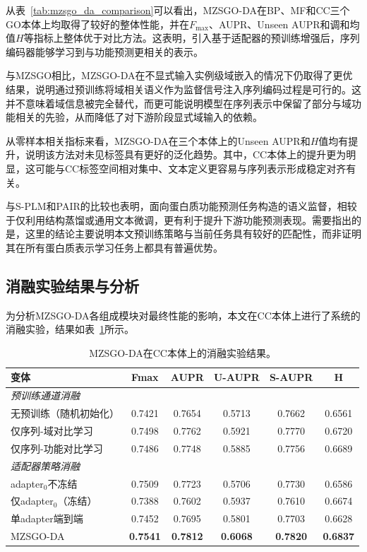 从表~\ref{tab:mzsgo_da_comparison}可以看出，MZSGO-DA在BP、MF和CC三个GO本体上均取得了较好的整体性能，并在$F_{\max}$、AUPR、Unseen AUPR和调和均值$H$等指标上整体优于对比方法。这表明，引入基于适配器的预训练增强后，序列编码器能够学习到与功能预测更相关的表示。

与MZSGO相比，MZSGO-DA在不显式输入实例级域嵌入的情况下仍取得了更优结果，说明通过预训练将域相关语义作为监督信号注入序列编码过程是可行的。这并不意味着域信息被完全替代，而更可能说明模型在序列表示中保留了部分与域功能相关的先验，从而降低了对下游阶段显式域输入的依赖。

从零样本相关指标来看，MZSGO-DA在三个本体上的Unseen AUPR和$H$值均有提升，说明该方法对未见标签具有更好的泛化趋势。其中，CC本体上的提升更为明显，这可能与CC标签空间相对集中、文本定义更容易与序列表示形成稳定对齐有关。

与S-PLM和PAIR的比较也表明，面向蛋白质功能预测任务构造的语义监督，相较于仅利用结构蒸馏或通用文本微调，更有利于提升下游功能预测表现。需要指出的是，这里的结论主要说明本文预训练策略与当前任务具有较好的匹配性，而非证明其在所有蛋白质表示学习任务上都具有普遍优势。

\subsection{消融实验结果与分析}

为分析MZSGO-DA各组成模块对最终性能的影响，本文在CC本体上进行了系统的消融实验，结果如表~\ref{tab:mzsgo_da_ablation}所示。

\begin{table}[htbp]
\centering
\caption{MZSGO-DA在CC本体上的消融实验结果。}
\label{tab:mzsgo_da_ablation}
\small
\begin{tabular}{lccccc}
\toprule
变体 & Fmax & AUPR & U-AUPR & S-AUPR & H \\
\midrule
\multicolumn{6}{l}{\textit{预训练通道消融}} \\
无预训练（随机初始化） & 0.7421 & 0.7654 & 0.5713 & 0.7662 & 0.6561 \\
仅序列-域对比学习 & 0.7498 & 0.7762 & 0.5921 & 0.7770 & 0.6720 \\
仅序列-功能对比学习 & 0.7486 & 0.7748 & 0.5885 & 0.7756 & 0.6689 \\
\midrule
\multicolumn{6}{l}{\textit{适配器策略消融}} \\
adapter$_0$不冻结 & 0.7509 & 0.7723 & 0.5706 & 0.7730 & 0.6586 \\
仅adapter$_0$（冻结） & 0.7388 & 0.7602 & 0.5937 & 0.7610 & 0.6674 \\
单adapter端到端 & 0.7452 & 0.7695 & 0.5801 & 0.7703 & 0.6628 \\
\midrule
MZSGO-DA & \textbf{0.7541} & \textbf{0.7812} & \textbf{0.6068} & \textbf{0.7820} & \textbf{0.6837} \\
\bottomrule
\end{tabular}
\end{table}

